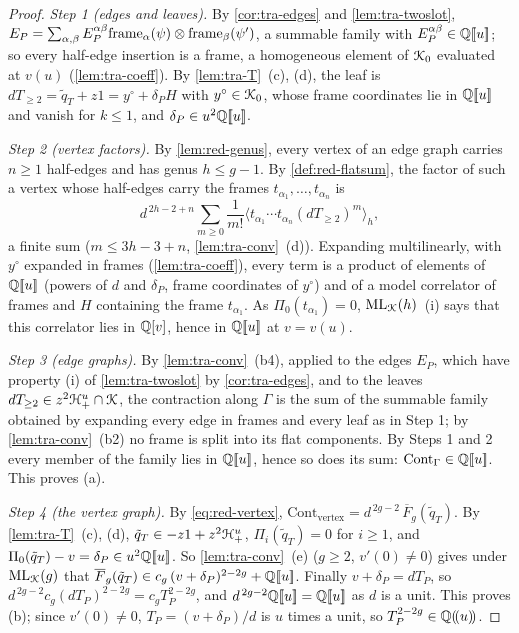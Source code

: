 \begin{proof}
\emph{Step 1 (edges and leaves).} By \cref{cor:tra-edges} and \cref{lem:tra-twoslot}, $E_P = \sum_{\alpha,\beta}E_P^{\alpha\beta}\mathrm{frame}_\alpha(\psi)\otimes\mathrm{frame}_\beta(\psi')$, a summable family with $E_P^{\alpha\beta}\in\mathbb{Q}[\![ u ]\!]$; so every half-edge insertion is a frame, a homogeneous element of $\mathcal{K}_{0}$ evaluated at $v(u)$ (\cref{lem:tra-coeff}). By \cref{lem:tra-T}~(c), (d), the leaf is $dT_{\geq 2} = \tilde q_T+z1 = y^\circ+\delta_PH$ with $y^\circ\in\mathcal{K}_{0}$, whose frame coordinates lie in $\mathbb{Q}[\![ u ]\!]$ and vanish for $k\leq 1$, and $\delta_P\in u^2\mathbb{Q}[\![ u ]\!]$.

\emph{Step 2 (vertex factors).} By \cref{lem:red-genus}, every vertex of an edge graph carries $n\geq 1$ half-edges and has genus $h\leq g-1$. By \cref{def:red-flatsum}, the factor of such a vertex whose half-edges carry the frames $t_{\alpha_1},\dots,t_{\alpha_n}$ is
\[
d^{\,2h-2+n}\sum_{m\geq 0}\frac1{m!}\langle t_{\alpha_1}\cdots t_{\alpha_n}(dT_{\geq 2})^m\rangle_h ,
\]
a finite sum ($m\leq 3h-3+n$, \cref{lem:tra-conv}~(d)). Expanding multilinearly, with $y^\circ$ expanded in frames (\cref{lem:tra-coeff}), every term is a product of elements of $\mathbb{Q}[\![ u ]\!]$ (powers of $d$ and $\delta_P$, frame coordinates of $y^\circ$) and of a model correlator of frames and $H$ containing the frame $t_{\alpha_1}$. As $\Pi_0(t_{\alpha_1}) = 0$, $\mathrm{ML}_{\mathcal{K}}(h)$~(i) says that this correlator lies in $\mathbb{Q}[v]$, hence in $\mathbb{Q}[\![ u ]\!]$ at $v = v(u)$.

\emph{Step 3 (edge graphs).} By \cref{lem:tra-conv}~(b4), applied to the edges $E_P$, which have property (i) of \cref{lem:tra-twoslot} by \cref{cor:tra-edges}, and to the leaves $dT_{\geq 2}\in z^2\mathcal{H}^u_+\cap\mathcal{K}$, the contraction along $\Gamma$ is the sum of the summable family obtained by expanding every edge in frames and every leaf as in Step 1; by \cref{lem:tra-conv}~(b2) no frame is split into its flat components. By Steps 1 and 2 every member of the family lies in $\mathbb{Q}[\![ u ]\!]$, hence so does its sum: $\mathrm{Cont}_\Gamma\in\mathbb{Q}[\![ u ]\!]$. This proves (a).

\emph{Step 4 (the vertex graph).} By \eqref{eq:red-vertex}, $\mathrm{Cont}_{\mathrm{vertex}} = d^{\,2g-2}\,\overline F_g(\tilde q_T)$. By \cref{lem:tra-T}~(c), (d), $\tilde q_T\in -z1+z^2\mathcal{H}^u_+$, $\Pi_i(\tilde q_T) = 0$ for $i\geq 1$, and $\Pi_0(\tilde q_T)-v = \delta_P\in u^2\mathbb{Q}[\![ u ]\!]$. So \cref{lem:tra-conv}~(e) ($g\geq 2$, $v'(0)\neq 0$) gives under $\mathrm{ML}_{\mathcal{K}}(g)$ that $\overline F_g(\tilde q_T)\in c_g\,(v+\delta_P)^{2-2g}+\mathbb{Q}[\![ u ]\!]$. Finally $v+\delta_P = dT_P$, so $d^{\,2g-2}c_g(dT_P)^{2-2g} = c_gT_P^{2-2g}$, and $d^{\,2g-2}\mathbb{Q}[\![ u ]\!] = \mathbb{Q}[\![ u ]\!]$ as $d$ is a unit. This proves (b); since $v'(0)\neq 0$, $T_P = (v+\delta_P)/d$ is $u$ times a unit, so $T_P^{2-2g}\in\mathbb{Q}(\!(u)\!)$.
\end{proof}

